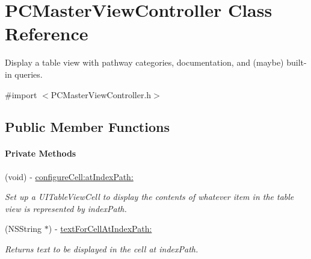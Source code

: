 \hypertarget{interface_p_c_master_view_controller}{
\section{PCMasterViewController Class Reference}
\label{interface_p_c_master_view_controller}
}


Display a table view with pathway categories, documentation, and (maybe) built-\/in queries.  




{\ttfamily \#import $<$PCMasterViewController.h$>$}

\subsection*{Public Member Functions}
\begin{Indent}\paragraph*{Private Methods}
\begin{DoxyCompactItemize}
\item 
\hypertarget{interface_p_c_master_view_controller_a294917e6dfc5344a849d19634b87ba2e}{
(void) -\/ \hyperlink{interface_p_c_master_view_controller_a294917e6dfc5344a849d19634b87ba2e}{configureCell:atIndexPath:}}
\label{interface_p_c_master_view_controller_a294917e6dfc5344a849d19634b87ba2e}

\begin{DoxyCompactList}\small\item\em Set up a UITableViewCell to display the contents of whatever item in the table view is represented by indexPath. \end{DoxyCompactList}\item 
\hypertarget{interface_p_c_master_view_controller_a6412085929551eade6df3985c48d44ce}{
(NSString $\ast$) -\/ \hyperlink{interface_p_c_master_view_controller_a6412085929551eade6df3985c48d44ce}{textForCellAtIndexPath:}}
\label{interface_p_c_master_view_controller_a6412085929551eade6df3985c48d44ce}

\begin{DoxyCompactList}\small\item\em Returns text to be displayed in the cell at indexPath. \end{DoxyCompactList}\end{DoxyCompactItemize}
\end{Indent}
